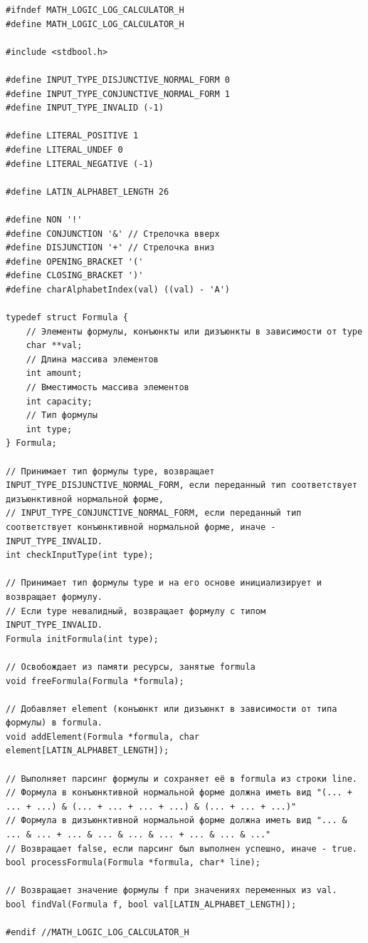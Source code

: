 \documentclass[a4paper,14pt]{extarticle}
\begin{document}
\begin{verbatim}
#ifndef MATH_LOGIC_LOG_CALCULATOR_H
#define MATH_LOGIC_LOG_CALCULATOR_H

#include <stdbool.h>

#define INPUT_TYPE_DISJUNCTIVE_NORMAL_FORM 0
#define INPUT_TYPE_CONJUNCTIVE_NORMAL_FORM 1
#define INPUT_TYPE_INVALID (-1)

#define LITERAL_POSITIVE 1
#define LITERAL_UNDEF 0
#define LITERAL_NEGATIVE (-1)

#define LATIN_ALPHABET_LENGTH 26

#define NON '!'
#define CONJUNCTION '&' // Стрелочка вверх
#define DISJUNCTION '+' // Стрелочка вниз
#define OPENING_BRACKET '('
#define CLOSING_BRACKET ')'
#define charAlphabetIndex(val) ((val) - 'A')

typedef struct Formula {
    // Элементы формулы, конъюнкты или дизъюнкты в зависимости от type
    char **val;
    // Длина массива элементов
    int amount;
    // Вместимость массива элементов
    int capacity;
    // Тип формулы
    int type;
} Formula;

// Принимает тип формулы type, возвращает INPUT_TYPE_DISJUNCTIVE_NORMAL_FORM, если переданный тип соответствует дизъюнктивной нормальной форме,
// INPUT_TYPE_CONJUNCTIVE_NORMAL_FORM, если переданный тип соответствует конъюнктивной нормальной форме, иначе - INPUT_TYPE_INVALID.
int checkInputType(int type);

// Принимает тип формулы type и на его основе инициализирует и возвращает формулу.
// Если type невалидный, возвращает формулу с типом INPUT_TYPE_INVALID.
Formula initFormula(int type);

// Освобождает из памяти ресурсы, занятые formula
void freeFormula(Formula *formula);

// Добавляет element (конъюнкт или дизъюнкт в зависимости от типа формулы) в formula.
void addElement(Formula *formula, char element[LATIN_ALPHABET_LENGTH]);

// Выполняет парсинг формулы и сохраняет её в formula из строки line.
// Формула в конъюнктивной нормальной форме должна иметь вид "(... + ... + ...) & (... + ... + ... + ...) & (... + ... + ...)"
// Формула в дизъюнктивной нормальной форме должна иметь вид "... & ... & ... + ... & ... & ... & ... + ... & ... & ..."
// Возвращает false, если парсинг был выполнен успешно, иначе - true.
bool processFormula(Formula *formula, char* line);

// Возвращает значение формулы f при значениях переменных из val.
bool findVal(Formula f, bool val[LATIN_ALPHABET_LENGTH]);

#endif //MATH_LOGIC_LOG_CALCULATOR_H
\end{verbatim}
\end{document}
